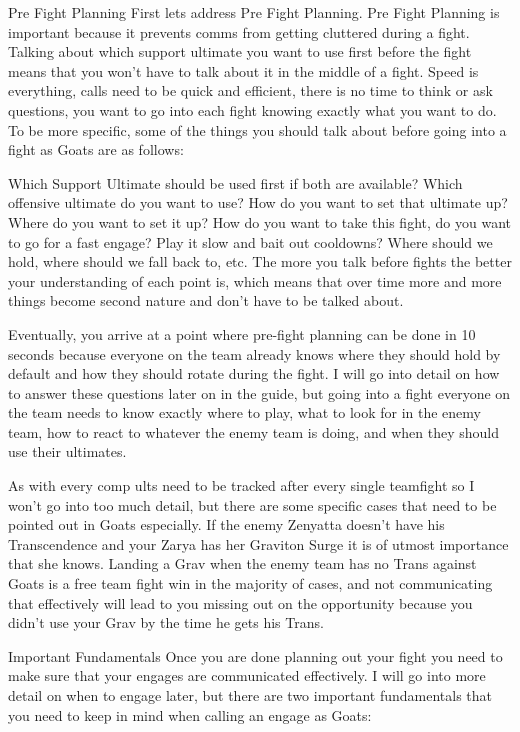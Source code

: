 Pre Fight Planning
First lets address Pre Fight Planning. Pre Fight Planning is important because it prevents comms from getting cluttered during a fight. Talking about which support ultimate you want to use first before the fight means that you won’t have to talk about it in the middle of a fight. Speed is everything, calls need to be quick and efficient, there is no time to think or ask questions, you want to go into each fight knowing exactly what you want to do. To be more specific, some of the things you should talk about before going into a fight as Goats are as follows:

Which Support Ultimate should be used first if both are available? Which offensive ultimate do you want to use? How do you want to set that ultimate up? Where do you want to set it up? How do you want to take this fight, do you want to go for a fast engage? Play it slow and bait out cooldowns? Where should we hold, where should we fall back to, etc. The more you talk before fights the better your understanding of each point is, which means that over time more and more things become second nature and don’t have to be talked about.

Eventually, you arrive at a point where pre-fight planning can be done in 10 seconds because everyone on the team already knows where they should hold by default and how they should rotate during the fight.
I will go into detail on how to answer these questions later on in the guide, but going into a fight everyone on the team needs to know exactly where to play, what to look for in the enemy team, how to react to whatever the enemy team is doing, and when they should use their ultimates.

As with every comp ults need to be tracked after every single teamfight so I won’t go into too much detail, but there are some specific cases that need to be pointed out in Goats especially. If the enemy Zenyatta doesn’t have his Transcendence and your Zarya has her Graviton Surge it is of utmost importance that she knows. Landing a Grav when the enemy team has no Trans against Goats is a free team fight win in the majority of cases, and not communicating that effectively will lead to you missing out on the opportunity because you didn’t use your Grav by the time he gets his Trans.

Important Fundamentals
Once you are done planning out your fight you need to make sure that your engages are communicated effectively. I will go into more detail on when to engage later, but there are two important fundamentals that you need to keep in mind when calling an engage as Goats: 

